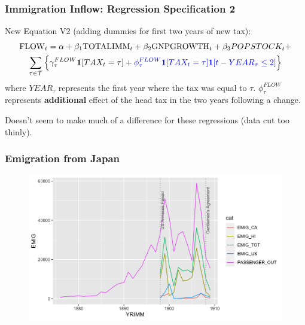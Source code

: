 \documentclass[pdf]{beamer}
\begin{document}
\begin{frame}[label = flow_reg2]
    \frametitle{Immigration Inflow: Regression Specification 2}
    New Equation V2 (adding dummies for first two years of new tax):
    \begin{multline}
        \text{FLOW}_t = \alpha + \beta_1\text{TOTALIMM}_t + \beta_2\text{GNPGROWTH}_t +  \beta_3 POPSTOCK_t + \\ \sum_{\tau \in \mathcal{T}} \Big\{ \gamma^{FLOW}_\tau \mathbf{1}[TAX_t = \tau] + \textcolor{blue}{\phi^{FLOW}_\tau \mathbf{1}[TAX_t = \tau] \mathbf{1}[t - YEAR_{\tau} \leq 2]} \Big\}
    \end{multline}
    where $YEAR_{\tau}$ represents the first year where the tax was equal to $\tau$. $\phi^{FLOW}_\tau$ represents \textbf{additional} effect of the head tax in the two years following a change.

    Doesn't seem to make much of a difference for these regressions (data cut too thinly).
\end{frame}


\appendix 

\begin{frame}[label = japan_emig]
	\frametitle{Emigration from Japan}
    \centering
	\begin{figure}[H]
		\begin{center}
			\includegraphics[width=\textwidth]{../../figs/6sep23/japan_emig.png}
		\end{center}
	\end{figure}
    \hyperlink{japanflow}{}
\end{frame}
\end{document}
